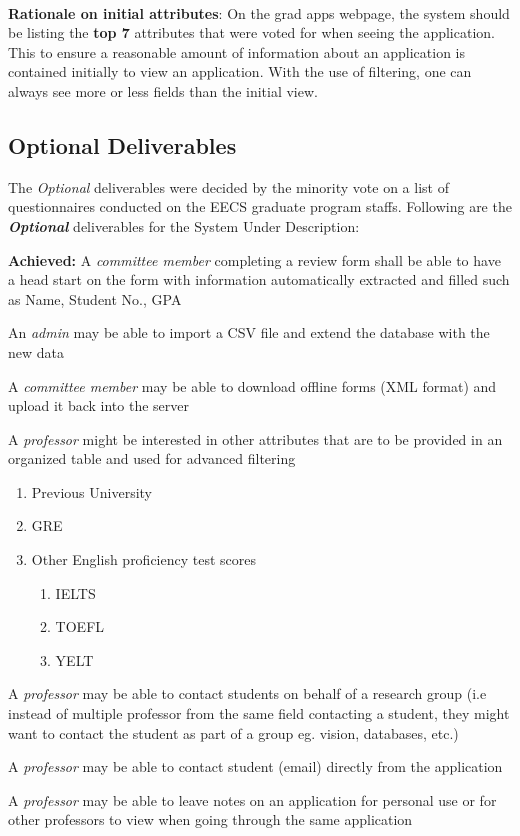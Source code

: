 \documentclass[fontsize=12pt,paper=letter,twoside]{scrartcl}
\begin{document}
\noindent \textbf{\\Rationale on initial attributes}: On the grad apps webpage, the system should be listing the \textbf{top 7} attributes that were voted for when seeing the application. This to ensure a reasonable amount of information about an application is contained initially to view an application. With the use of filtering, one can always see more or less fields than the initial view.

\newpage
\subsection{Optional Deliverables} \label{opt_delvs}

The \emph{Optional} deliverables were decided by the minority vote on a list of questionnaires conducted on the EECS graduate program staffs. Following are the \textbf{\emph{Optional}} deliverables for the System Under Description:\\

\begin{mylist}
\item \textbf{Achieved:} A \emph{committee member} completing a review form shall be able to have a head start on the form with information automatically extracted and filled such as Name, Student No., GPA
\item An \emph{admin} may be able to import a CSV file and extend the database with the new data
\item A \emph{committee member} may be able to download offline forms (XML format) and upload it back into the server
\item A \emph{professor} might be interested in other attributes that are to be provided in an organized table and used for advanced filtering
\begin{enumerate}
\item Previous University
\item GRE
\item Other English proficiency test scores
\begin{enumerate}
\item IELTS
\item TOEFL
\item YELT
\end{enumerate}
\end{enumerate}
\item A \emph{professor} may be able to contact students on behalf of a research group (i.e instead of multiple professor from the same field contacting a student, they might want to contact the student as part of a group eg. vision, databases, etc.)
\item A \emph{professor} may be able to contact student (email) directly from the application
\item A \emph{professor} may be able to leave notes on an application for personal use or for other professors to view when going through the same application
\end{mylist}
\end{document}
